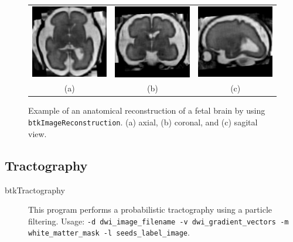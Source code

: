\begin{figure}[t]
\centering
\begin{tabular}{ccc}
\includegraphics[width=0.3\columnwidth]{hr_axl.eps}&
\includegraphics[width=0.3\columnwidth]{hr_cor.eps}&
\includegraphics[width=0.3\columnwidth]{hr_sag.eps}\\
{(a)}&{(b)}&{(c)}\\
\end{tabular}
\caption{Example of an anatomical reconstruction of a fetal brain by using
\texttt{btkImageReconstruction}. (a) axial, (b) coronal, and (c) sagital view.}
\label{fig:reconstruction}
\end{figure}


\subsection{Tractography}

\begin{description}
 \item[btkTractography] This program performs a probabilistic tractography using a particle filtering. Usage: \texttt{-d dwi\_image\_filename -v dwi\_gradient\_vectors -m white\_matter\_mask -l seeds\_la\-bel\_image}.
\end{description}

